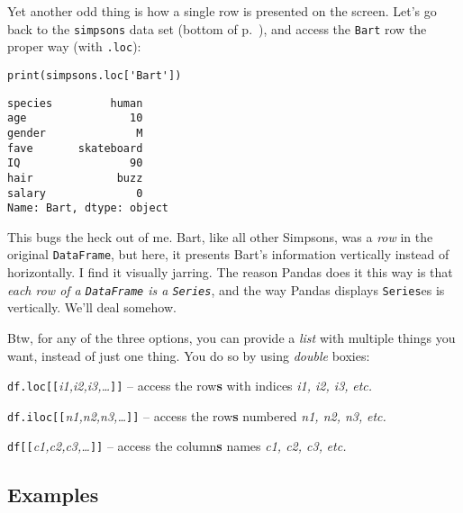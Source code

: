 
Yet another odd thing is how a single row is presented on the screen. Let's go
back to the \texttt{simpsons} data set (bottom of p.~\pageref{finalSimpsons}),
and access the \texttt{Bart} row the proper way (with \texttt{.loc}):

\begin{Verbatim}[fontsize=\small,samepage=true,frame=single,framesep=3mm]
print(simpsons.loc['Bart'])
\end{Verbatim}
\vspace{-.2in}

\begin{Verbatim}[fontsize=\small,samepage=true,frame=leftline,framesep=5mm,framerule=1mm]
species         human
age                10
gender              M
fave       skateboard
IQ                 90
hair             buzz
salary              0
Name: Bart, dtype: object
\end{Verbatim}

This bugs the heck out of me. Bart, like all other Simpsons, was a \textit{row}
in the original \texttt{DataFrame}, but here, it presents Bart's information
vertically instead of horizontally. I find it visually jarring. The reason
Pandas does it this way is that \textit{each row of a \texttt{DataFrame} is a
\texttt{Series}}, and the way Pandas displays \texttt{Series}es is vertically.
We'll deal somehow.


Btw, for any of the three options, you can provide a \textit{list} with
multiple things you want, instead of just one thing. You do so by using
\textit{double} boxies:

\begin{compactitem}
\item \texttt{df.loc[[}\textsl{i1,i2,i3,\dots}\texttt{]]} -- access the
row\textbf{s} with indices \textsl{i1, i2, i3,} \textit{etc.}
\item \texttt{df.iloc[[}\textsl{n1,n2,n3,\dots}\texttt{]]} -- access the row\textbf{s}
numbered \textsl{n1, n2, n3,} \textit{etc.}
\item \texttt{df[[}\textsl{c1,c2,c3,\dots}\texttt{]]} -- access the
column\textbf{s} names \textsl{c1, c2, c3,} \textit{etc.}
\end{compactitem}

\subsection{Examples}

